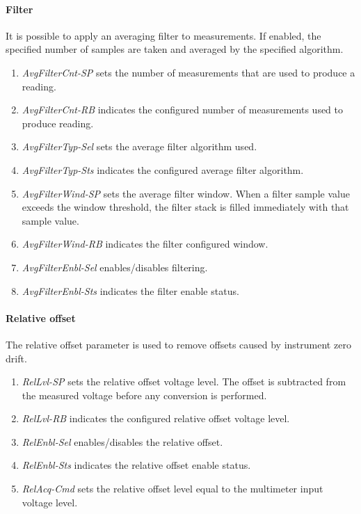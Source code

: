 \documentclass[openany]{article}
\begin{document}
		\paragraph{Filter} It is possible to apply an averaging filter to measurements. If enabled, the specified number of samples are taken and averaged by the specified algorithm.

			\noindent{}

			\begin{enumerate}
				\item \emph{AvgFilterCnt-SP} sets the number of measurements that are used to produce a reading.
				\item \emph{AvgFilterCnt-RB} indicates the configured number of measurements used to produce reading.
				\item \emph{AvgFilterTyp-Sel} sets the average filter algorithm used.
				\item \emph{AvgFilterTyp-Sts} indicates the configured average filter algorithm.
				\item \emph{AvgFilterWind-SP} sets the average filter window. When a filter sample value exceeds the window threshold, the filter stack is filled immediately with that sample value.
				\item \emph{AvgFilterWind-RB} indicates the filter configured window.
				\item \emph{AvgFilterEnbl-Sel} enables/disables filtering.
				\item \emph{AvgFilterEnbl-Sts} indicates the filter enable status.
			\end{enumerate}

	\bigskip
	\noindent{}

		\paragraph{Relative offset}\label{relative-offset} The relative offset parameter is used to remove offsets caused by instrument zero drift.

			\noindent{}

			\begin{enumerate}
				\item \emph{RelLvl-SP} sets the relative offset voltage level. The offset is subtracted from the measured voltage before any conversion is performed.
				\item \emph{RelLvl-RB} indicates the configured relative offset voltage level.
				\item \emph{RelEnbl-Sel} enables/disables the relative offset.
				\item \emph{RelEnbl-Sts} indicates the relative offset enable status.
				\item \emph{RelAcq-Cmd} sets the relative offset level equal to the multimeter input voltage level.
			\end{enumerate}
\end{document}
